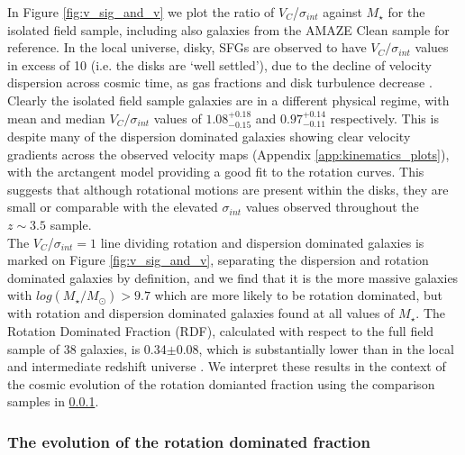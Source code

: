 \documentclass[fleqn,usenatbib]{mn2e}
\begin{document}
In Figure \ref{fig:v_sig_and_v} we plot the ratio of $V_{C}$/$\sigma_{int}$ against $M_{\star}$ for the isolated field sample, including also galaxies from the AMAZE Clean sample for reference.
In the local universe, disky, SFGs are observed to have $V_{C}/\sigma_{int}$ values in excess of 10 (i.e. the disks are `well settled'), due to the decline of velocity dispersion across cosmic time, as gas fractions and disk turbulence decrease \citep[e.g.][]{Epinat2008,Epinat2008a}.
Clearly the isolated field sample galaxies are in a different physical regime, with mean and median $V_{C}/\sigma_{int}$ values of $1.08^{+0.18}_{-0.15}$ and $0.97^{+0.14}_{-0.11}$ respectively.
This is despite many of the dispersion dominated galaxies showing clear velocity gradients across the observed velocity maps (Appendix \ref{app:kinematics_plots}), with the arctangent model providing a good fit to the rotation curves.
This suggests that although rotational motions are present within the disks, they are small or comparable with the elevated $\sigma_{int}$ values observed throughout the $z \sim 3.5$ sample. \\

The $V_{C}$/$\sigma_{int}=1$ line dividing rotation and dispersion dominated galaxies is marked on Figure \ref{fig:v_sig_and_v}, separating the dispersion and rotation dominated galaxies by definition, and we find that it is the more massive galaxies with $log(M_{\star}/M_{\odot}) > 9.7$ which are more likely to be rotation dominated, but with rotation and dispersion dominated galaxies found at all values of $M_{\star}$.
The Rotation Dominated Fraction (RDF), calculated with respect to the full field sample of 38 galaxies, is 0.34$\pm0.08$, which is substantially lower than in the local and intermediate redshift universe \citep[e.g.][]{Epinat2008a,Epinat2008,Green2014}.
We interpret these results in the context of the cosmic evolution of the rotation domianted fraction using the comparison samples in \cref{subsubsec:RDF_evolution}.\\

\subsubsection{The evolution of the rotation dominated fraction}\label{subsubsec:RDF_evolution}
\end{document}
